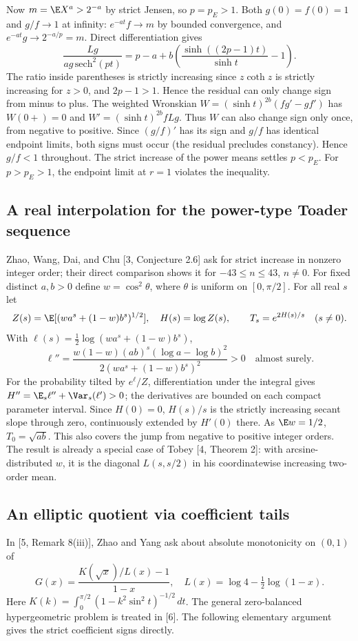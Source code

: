 \documentclass[11pt,a4paper]{article}
\numberwithin{equation}{section}
\theoremstyle{definition}
\theoremstyle{remark}
\begin{document}
Now $m=\E X^a>2^{-a}$ by strict Jensen, so $p=p_E>1$.
Both $g(0)=f(0)=1$ and $g/f\to1$ at infinity: $e^{-at}f\to m$ by bounded convergence, and $e^{-at}g\to2^{-a/p}=m$. Direct differentiation gives
\[
 \frac{Lg}{a g\,\mathrm{sech}^2(pt)}
 =p-a+b\left(\frac{\sinh((2p-1)t)}{\sinh t}-1\right).
\]
The ratio inside parentheses is strictly increasing since $z\coth z$ is
strictly increasing for $z>0$, and $2p-1>1$. Hence the residual can
only change sign from minus to plus. The weighted Wronskian
$W=(\sinh t)^{2b}(fg'-gf')$ has $W(0+)=0$ and
$W'=(\sinh t)^{2b} f Lg$. Thus $W$ can also change sign only once,
from negative to positive. Since $(g/f)'$ has its sign and $g/f$ has identical endpoint limits, both signs must occur (the residual precludes constancy). Hence $g/f<1$ throughout. The strict increase of the power means settles $p<p_E$. For $p>p_E>1$, the endpoint limit at $r=1$ violates the inequality.

\subsection{A real interpolation for the power-type Toader sequence}
Zhao, Wang, Dai, and Chu [3, Conjecture 2.6] ask for strict increase in
nonzero integer order; their direct comparison shows it for
$-43\le n\le43$, $n\ne0$. For fixed distinct $a,b>0$ define $w=\cos^2\theta$,
where $\theta$ is uniform on $[0,\pi/2]$. For all real $s$ let
\[
 Z(s)=\E[(w a^s+(1-w)b^s)^{1/2}],\quad H(s)=\log Z(s),
 \qquad T_s=e^{2H(s)/s}\quad(s\ne0).
\]
With $\ell(s)=\tfrac12\log(wa^s+(1-w)b^s)$,
\[
 \ell''=\frac{w(1-w)(ab)^s(\log a-\log b)^2}
 {2(wa^s+(1-w)b^s)^2}>0\quad\text{almost surely}.
\]
For the probability tilted by $e^\ell/Z$, differentiation under the integral
gives $H''=\E_s\ell''+\Var_s(\ell')>0$; the derivatives are bounded on
each compact parameter interval. Since $H(0)=0$, $H(s)/s$ is the
strictly increasing secant slope through zero, continuously extended by
$H'(0)$ there. As $\E w=1/2$, $T_0=\sqrt{ab}$. This also covers the
jump from negative to positive integer orders. The result is already a
special case of Tobey [4, Theorem 2]: with arcsine-distributed $w$, it is
the diagonal $L(s,s/2)$ in his coordinatewise increasing two-order mean.

\subsection{An elliptic quotient via coefficient tails}
In [5, Remark 8(iii)], Zhao and Yang ask about absolute monotonicity on
$(0,1)$ of
\[
 G(x)=\frac{K(\sqrt{x})/L(x)-1}{1-x},\quad
 L(x)=\log 4-\tfrac12\log(1-x).
\]
Here $K(k)=\int_0^{\pi/2}(1-k^2\sin^2 t)^{-1/2}\,dt$.
The general zero-balanced hypergeometric problem is treated in [6].
The following elementary argument gives the strict coefficient signs directly.
\end{document}
